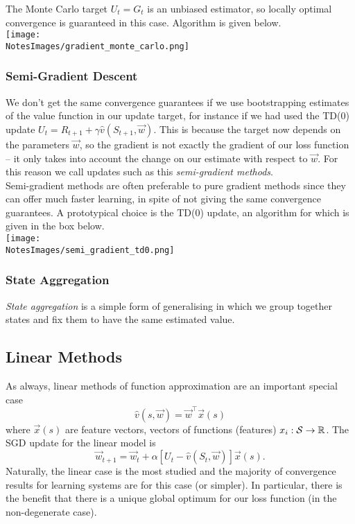 The Monte Carlo target $U_t = G_t$ is an unbiased estimator, so locally optimal convergence is guaranteed in this case. Algorithm is given below.\\

\texttt{[image: \\NotesImages/gradient\_monte\_carlo.png]}\\

\subsubsection*{Semi-Gradient Descent}
We don't get the same convergence guarantees if we use bootstrapping estimates of the value function in our update target, for instance if we had used the TD(0) update $U_t = R_{t+1} + \gamma \hat{v}(S_{t+1}, \vec{w})$. This is because the target now depends on the parameters $\vec{w}$, so the gradient is not exactly the gradient of our loss function -- it only takes into account the change on our estimate with respect to $\vec{w}$. For this reason we call updates such as this \emph{semi-gradient methods}.\\

Semi-gradient methods are often preferable to pure gradient methods since they can offer much faster learning, in spite of not giving the same convergence guarantees. A prototypical choice is the TD(0) update, an algorithm for which is given in the box below.\\

\texttt{[image: \\NotesImages/semi\_gradient\_td0.png]}\\

\subsubsection*{State Aggregation}
\emph{State aggregation} is a simple form of generalising in which we group together states and fix them to have the same estimated value. 

\subsection{Linear Methods}
As always, linear methods of function approximation are an important special case
\begin{equation}
    \hat{v}(s, \vec{w}) = \vec{w}^\top \vec{x}(s)
\end{equation}
where $\vec{x}(s)$ are feature vectors, vectors of functions (features) $x_i: \S{} \to \mathbb{R}$. The SGD update for the linear model is
\begin{equation}
    \vec{w}_{t+1} = \vec{w}_t + \alpha \left[ U_t - \hat{v}(S_t, \vec{w})\right] \vec{x}(s).
\end{equation}
Naturally, the linear case is the most studied and the majority of convergence results for learning systems are for this case (or simpler). In particular, there is the benefit that there is a unique global optimum for our loss function (in the non-degenerate case).


